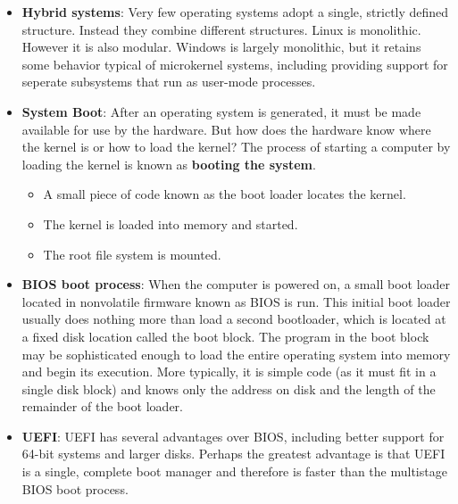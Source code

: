 \documentclass{report}
\begin{document}
\begin{itemize}
            \bigbreak \noindent 
            The overall result resembles a layered system in that each kernel section has defined, protected interfaces; but it is more flexible than a layered system, because any module can call any other module.
            \bigbreak \noindent 
            Also similar to the microkernel approach in that the primary module has only core functions and knowledge of how to load and communicate with other modules.
            \bigbreak \noindent 
            \textbf{Note:} Linux uses loadable kernel modules.
        \item \textbf{Hybrid systems}: Very few operating systems adopt a single, strictly defined structure. Instead they combine different structures. Linux is monolithic. However it is also modular.
            \bigbreak \noindent 
            Windows is largely monolithic, but it retains some behavior typical of microkernel systems, including providing support for seperate subsystems that run as user-mode processes.
        \item \textbf{System Boot}: After an operating system is generated, it must be made available for use by the hardware. But how does the hardware know where the kernel is or how to load the kernel?
            \bigbreak \noindent 
            The process of starting a computer by loading the kernel is known as \textbf{booting the system}.
            \begin{itemize}
                \item A small piece of code known as the boot loader locates the kernel.
                \item The kernel is loaded into memory and started.
                \item The root file system is mounted.
            \end{itemize}
        \item \textbf{BIOS boot process}: When the computer is powered on, a small boot loader located in nonvolatile firmware known as BIOS is run. This initial boot loader usually does nothing more than load a second bootloader, which is located at a fixed disk location called the boot block.
            \bigbreak \noindent 
            The program in the boot block may be sophisticated enough to load the entire operating system into memory and begin its execution. More typically, it is simple code (as it must fit in a single disk block) and knows only the address on disk and the length of the remainder of the boot loader.
            \bigbreak \noindent 
        \item \textbf{UEFI}: UEFI has several advantages over BIOS, including better support for 64-bit systems and larger disks. Perhaps the greatest advantage is that UEFI is a single, complete boot manager and therefore is faster than the multistage BIOS boot process.

\end{itemize}
\end{document}
